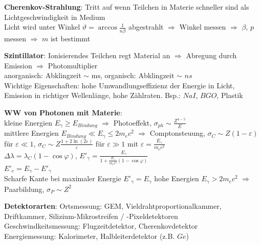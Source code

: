 \documentclass[10pt,twoside,a4paper]{article}
\begin{document}
\begin{multicols*}{3}
\textbf{Cherenkov-Strahlung}: Tritt auf wenn Teilchen in Materie schneller sind als Lichtgeschwindigkeit in Medium \\
Licht wird unter Winkel $\vartheta = \arccos \frac{1}{n \beta}$ abgestrahlt $\Rightarrow$ Winkel messen $\Rightarrow$ $\beta$, $p$ messen $\Rightarrow$ $m$ ist bestimmt

\textbf{Szintillator}: Ionisierendes Teilchen regt Material an $\Rightarrow$ Abregung durch Emission $\Rightarrow$ Photomultiplier \\
anorganisch: Abklingzeit $\sim$ $\si{\ms}$, organisch: Abklingzeit $\sim$ $\si{ns}$ \\
Wichtige Eigenschaften: hohe Umwandlungseffizienz der Energie in Licht, Emission in richtiger Wellenlänge, hohe Zählraten. Bsp.: $NaI$, $BGO$, Plastik

\textbf{WW von Photonen mit Materie}: \\ 
kleine Energien $E_{\gamma} \geq E_{Bindung}$ $\Rightarrow$ Photoeffekt, $\sigma_{ph} \sim \frac{Z^{4-5}}{E}$ \\
mittlere Energien $E_{Bindung} \ll E_{\gamma} \leq 2 m_e c^2$ $\Rightarrow$ Comptonsteuung, $\sigma_{C} \sim Z(1 - \varepsilon)$ für $\varepsilon \ll 1$, $\sigma_{C} \sim Z \frac{1 + 2 \ln (2 \varepsilon)}{\varepsilon}$ für $\varepsilon \gg 1$ mit $\varepsilon = \frac{E_{\gamma}}{m_e c^2}$ \\
$\Delta \lambda = \lambda_C \left( 1 - \cos \varphi \right)$, $E'_{\gamma} = \frac{E_{\gamma}}{1 + \frac{E_{\gamma}}{m_e c^2} \left( 1 - \cos \varphi \right)}$ \\
$E'_e = E_{\gamma} - E'_{\gamma}$ \\
Scharfe Kante bei maximaler Energie $E'_{\gamma} = E_{\gamma}$
hohe Energien $E_{\gamma} > 2 m_e c^2$ $\Rightarrow$ Paarbildung, $\sigma_P \sim Z^2$

\textbf{Detektorarten}: Ortsmessung: GEM, Vieldrahtproportionalkammer, Driftkammer, Silizium-Mikrostreifen / -Pixeldetektoren \\
Geschwindkeitsmessung: Flugzeitdetektor, Cherenkovdetektor \\
Energiemessung: Kalorimeter, Halbleiterdetektor (z.B. $Ge$)


\end{multicols*}
\end{document}
